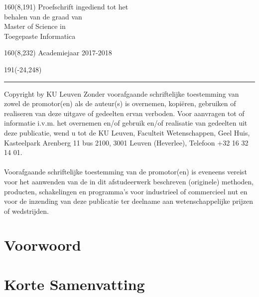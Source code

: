 \documentclass[12pt,a4paper,oneside]{book}
\begin{document}
%
\begin{textblock}{160}(8,191)
\textblockcolour{}
\vspace{-\parskip}
\flushright
Proefschrift ingediend tot het\\[4.5pt]
behalen van de graad van\\[4.5pt]
Master of Science in\\[4.5pt]
Toegepaste Informatica\\
\end{textblock}
%
\begin{textblock}{160}(8,232)
\textblockcolour{}
\vspace{-\parskip}
\flushright
Academiejaar 2017-2018
\end{textblock}
%
\begin{textblock}{191}(-24,248)
{\color{blueline}\rule{550pt}{5.5pt}}
\end{textblock}
%
\vfill
\newpage
\thispagestyle{empty}
\textsf{\textcopyright} Copyright by KU Leuven
Zonder voorafgaande schriftelijke toestemming van zowel de promotor(en) als de auteur(s) is overnemen, kopiëren, gebruiken of realiseren van deze uitgave of gedeelten ervan verboden. Voor aanvragen tot of informatie i.v.m. het overnemen en/of gebruik en/of realisatie van gedeelten uit deze publicatie, wend u tot de KU Leuven, Faculteit Wetenschappen, Geel Huis, Kasteelpark Arenberg 11 bus 2100, 3001 Leuven (Heverlee), Telefoon +32 16 32 14 01.
\\\\
Voorafgaande schriftelijke toestemming van de promotor(en) is eveneens vereist voor het aanwenden van de in dit afstudeerwerk beschreven (originele) methoden, producten, schakelingen en programma’s voor industrieel of commercieel nut en voor de inzending van deze publicatie ter deelname aan wetenschappelijke prijzen of wedstrijden.

\vfill
\newpage

\rmfamily
\setcounter{page}{0}
\frontmatter
\chapter{Voorwoord}
\chapter{Korte Samenvatting}
\end{document}
